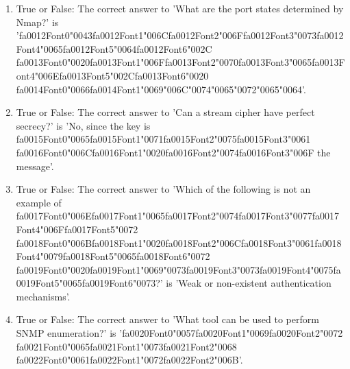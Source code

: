 \documentclass[12pt]{article}
\begin{document}
\begin{enumerate}[label=\arabic*.]
\item True or False: The correct answer to 'What are the port states determined by Nmap?' is '{\csname fa0012Font0\endcsname\char"0043}{\csname fa0012Font1\endcsname\char"006C}{\csname fa0012Font2\endcsname\char"006F}{\csname fa0012Font3\endcsname\char"0073}{\csname fa0012Font4\endcsname\char"0065}{\csname fa0012Font5\endcsname\char"0064}{\csname fa0012Font6\endcsname\char"002C} {\csname fa0013Font0\endcsname\char"0020}{\csname fa0013Font1\endcsname\char"006F}{\csname fa0013Font2\endcsname\char"0070}{\csname fa0013Font3\endcsname\char"0065}{\csname fa0013Font4\endcsname\char"006E}{\csname fa0013Font5\endcsname\char"002C}{\csname fa0013Font6\endcsname\char"0020} {\csname fa0014Font0\endcsname\char"0066}{\csname fa0014Font1\endcsname\char"0069}{\char"006C}{\char"0074}{\char"0065}{\char"0072}{\char"0065}{\char"0064}'.
\item True or False: The correct answer to 'Can a stream cipher have perfect secrecy?' is 'No, since the key is {\csname fa0015Font0\endcsname\char"0065}{\csname fa0015Font1\endcsname\char"0071}{\csname fa0015Font2\endcsname\char"0075}{\csname fa0015Font3\endcsname\char"0061} {\csname fa0016Font0\endcsname\char"006C}{\csname fa0016Font1\endcsname\char"0020}{\csname fa0016Font2\endcsname\char"0074}{\csname fa0016Font3\endcsname\char"006F} the message'.
\item True or False: The correct answer to 'Which of the following is not an example of {\csname fa0017Font0\endcsname\char"006E}{\csname fa0017Font1\endcsname\char"0065}{\csname fa0017Font2\endcsname\char"0074}{\csname fa0017Font3\endcsname\char"0077}{\csname fa0017Font4\endcsname\char"006F}{\csname fa0017Font5\endcsname\char"0072} {\csname fa0018Font0\endcsname\char"006B}{\csname fa0018Font1\endcsname\char"0020}{\csname fa0018Font2\endcsname\char"006C}{\csname fa0018Font3\endcsname\char"0061}{\csname fa0018Font4\endcsname\char"0079}{\csname fa0018Font5\endcsname\char"0065}{\csname fa0018Font6\endcsname\char"0072} {\csname fa0019Font0\endcsname\char"0020}{\csname fa0019Font1\endcsname\char"0069}{\char"0073}{\csname fa0019Font3\endcsname\char"0073}{\csname fa0019Font4\endcsname\char"0075}{\csname fa0019Font5\endcsname\char"0065}{\csname fa0019Font6\endcsname\char"0073}?' is 'Weak or non-existent authentication mechanisms'.
\item True or False: The correct answer to 'What tool can be used to perform SNMP enumeration?' is '{\csname fa0020Font0\endcsname\char"0057}{\csname fa0020Font1\endcsname\char"0069}{\csname fa0020Font2\endcsname\char"0072} {\csname fa0021Font0\endcsname\char"0065}{\csname fa0021Font1\endcsname\char"0073}{\csname fa0021Font2\endcsname\char"0068} {\csname fa0022Font0\endcsname\char"0061}{\csname fa0022Font1\endcsname\char"0072}{\csname fa0022Font2\endcsname\char"006B}'.

\end{enumerate}
\end{document}
